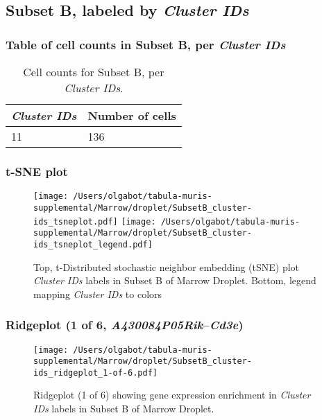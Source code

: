 \clearpage

\subsection{Subset B, labeled by \emph{Cluster IDs}}
\subsubsection{Table of cell counts in Subset B, per \emph{Cluster IDs}}\begin{table}[h]
\centering
\label{my-label}
\begin{tabular}{@{}ll@{}}
\toprule

\emph{Cluster IDs}& Number of cells \\ \midrule
11 & 136 \\
\bottomrule
\end{tabular}
\caption{Cell counts for Subset B, per \emph{Cluster IDs}.}
\end{table}

\clearpage
\subsubsection{t-SNE plot}
\begin{figure}[h]
\centering
\texttt{[image: /Users/olgabot/tabula-muris-supplemental/Marrow/droplet/SubsetB\_cluster-ids\_tsneplot.pdf]}
\texttt{[image: /Users/olgabot/tabula-muris-supplemental/Marrow/droplet/SubsetB\_cluster-ids\_tsneplot\_legend.pdf]}
\caption{Top, t-Distributed stochastic neighbor embedding (tSNE) plot  \emph{Cluster IDs} labels in Subset B of Marrow Droplet. Bottom, legend mapping \emph{Cluster IDs} to colors}
\end{figure}


\clearpage

\subsubsection{Ridgeplot (1 of 6, \emph{A430084P05Rik}--\emph{Cd3e})}
\begin{figure}[h]
\centering
\texttt{[image: /Users/olgabot/tabula-muris-supplemental/Marrow/droplet/SubsetB\_cluster-ids\_ridgeplot\_1-of-6.pdf]}

\caption{ Ridgeplot (1 of 6)  showing gene expression enrichment in \emph{Cluster IDs} labels in Subset B of Marrow Droplet. }
\end{figure}


